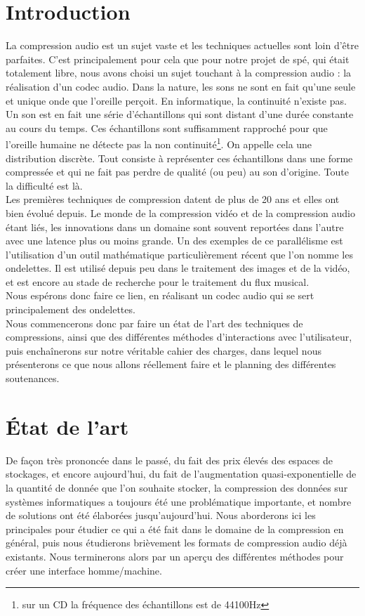 \section*{Introduction}
La compression audio est un sujet vaste et les techniques actuelles sont
loin d'être  parfaites.  C'est principalement pour  cela que  pour notre
projet de spé,  qui était totalement  libre,  nous avons choisi un sujet
touchant à la compression audio : la réalisation d'un codec audio.  Dans
la nature,  les  sons ne sont  en fait qu'une  seule et unique  onde que
l'oreille perçoit.  En informatique, la continuité n'existe pas.  Un son
est  en fait  une série  d'échantillons  qui  sont  distant  d'une durée
constante  au  cours  du  temps.   Ces  échantillons  sont  suffisamment
rapproché  pour  que   l'oreille   humaine   ne   détecte   pas  la  non
continuité\footnote{sur  un  CD la  fréquence  des  échantillons  est de
44100Hz}.  On appelle  cela une distribution  discrète.  Tout consiste à
représenter ces  échantillons dans une  forme compressée et  qui ne fait
pas perdre  de qualité (ou  peu) au son  d'origine.  Toute la difficulté
est là.\\
Les premières  techniques de  compression datent  de plus  de 20  ans et
elles ont bien évolué depuis.  Le monde de la compression vidéo et de la
compression audio  étant  liés,  les  innovations  dans  un domaine sont
souvent reportées  dans l'autre avec  une latence plus  ou moins grande.
Un  des  exemples  de  ce  parallélisme  est  l'utilisation  d'un  outil
mathématique particulièrement récent que  l'on nomme les ondelettes.  Il
est utilisé depuis peu dans le traitement des images et de la vidéo,  et
est encore au  stade de recherche pour le  traitement du flux musical.\\
Nous espérons  donc faire ce lien,  en  réalisant un codec  audio qui se
sert principalement des ondelettes.\\
Nous commencerons  donc par  faire un  état de  l'art des  techniques de
compressions,  ainsi  que des  différentes méthodes  d'interactions avec
l'utilisateur, puis enchaînerons sur notre véritable cahier des charges,
dans lequel nous présenterons ce que  nous allons réellement faire et le
planning des différentes soutenances.

\section{\'Etat de l'art}
De façon  très prononcée  dans le  passé,  du fait  des prix  élevés des
espaces de stockages,  et encore aujourd'hui,  du fait de l'augmentation
quasi-exponentielle de la quantité de  donnée que l'on souhaite stocker,
la compression des données sur systèmes informatiques a toujours été une
problématique  importante,  et nombre  de  solutions  ont  été élaborées
jusqu'aujourd'hui.  Nous aborderons ici les  principales pour étudier ce
qui a été fait dans le  domaine de la compression en général,  puis nous
étudierons brièvement  les formats de compression  audio déjà existants.
Nous terminerons alors par un aperçu des différentes méthodes pour créer
une interface homme/machine.


